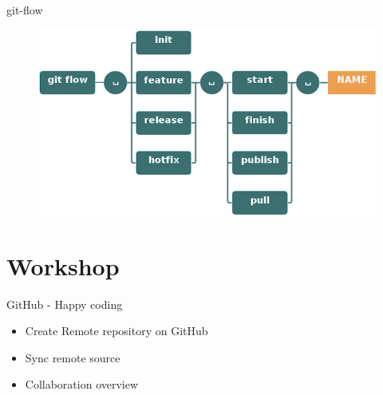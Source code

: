 \documentclass{beamer}
\begin{document}
\begin{frame}{git-flow}
    \begin{figure}
        \center
        \includegraphics[width=.9\textwidth]{git-flow-commands}
        \label{fig:git-flow-commands}
    \end{figure}
\end{frame}

\section{Workshop}
\begin{frame}{GitHub - Happy coding}
    \begin{itemize}
        \item Create Remote repository on GitHub
        \item Sync remote source
        \item Collaboration overview
    \end{itemize}
\end{frame}
\end{document}
